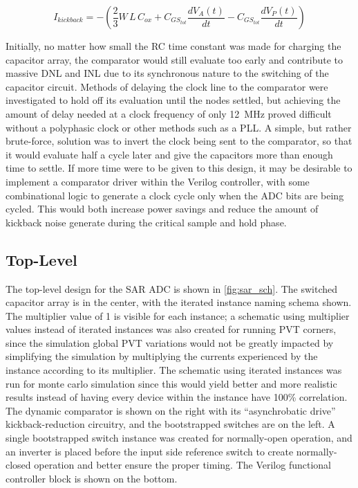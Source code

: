 \documentclass[11pt,letterpaper]{article}
\begin{document}
\begin{equation}
    I_{kickback} = -\left(\frac{2}{3}W\,L\,C_{ox} + C_{GS_{tot}}\frac{dV_A(t)}{dt} - C_{GS_{tot}}\frac{dV_P(t)}{dt}\right)\label{eq:kickback}
\end{equation}

Initially, no matter how small the RC time constant was made for charging the capacitor array, the comparator would still evaluate too early and contribute to massive DNL and INL due to its synchronous nature to the switching of the capacitor circuit. Methods of delaying the clock line to the comparator were investigated to hold off its evaluation until the nodes settled, but achieving the amount of delay needed at a clock frequency of only \qty{12}{\MHz} proved difficult without a polyphasic clock or other methods such as a PLL\@. A simple, but rather brute-force, solution was to invert the clock being sent to the comparator, so that it would evaluate half a cycle later and give the capacitors more than enough time to settle. If more time were to be given to this design, it may be desirable to implement a comparator driver within the Verilog controller, with some combinational logic to generate a clock cycle only when the ADC bits are being cycled. This would both increase power savings and reduce the amount of kickback noise generate during the critical sample and hold phase.

\subsection{Top-Level}

The top-level design for the SAR ADC is shown in \cref{fig:sar_sch}. The switched capacitor array is in the center, with the iterated instance naming schema shown. The multiplier value of 1 is visible for each instance; a schematic using multiplier values instead of iterated instances was also created for running PVT corners, since the simulation global PVT variations would not be greatly impacted by simplifying the simulation by multiplying the currents experienced by the instance according to its multiplier. The schematic using iterated instances was run for monte carlo simulation since this would yield better and more realistic results instead of having every device within the instance have 100\% correlation. The dynamic comparator is shown on the right with its ``asynchrobatic drive'' kickback-reduction circuitry, and the bootstrapped switches are on the left. A single bootstrapped switch instance was created for normally-open operation, and an inverter is placed before the input side reference switch to create normally-closed operation and better ensure the proper timing. The Verilog functional controller block is shown on the bottom.
\end{document}
